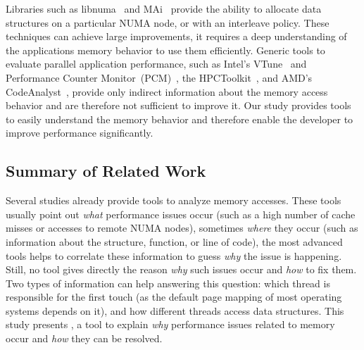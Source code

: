 Libraries such as libnuma~\cite{Kleen2004} and MAi~\cite{Ribeiro2009} provide
the ability to allocate data structures on a particular NUMA node, or with an
interleave policy. These techniques can achieve large improvements, it
requires a deep understanding of the applications memory behavior to use them
efficiently.
Generic tools to evaluate parallel application performance, such as Intel's
VTune~\cite{Reinders05VTune} and Performance Counter
Monitor~(PCM)~\cite{Intel2012b}, the HPCToolkit~\cite{Adhianto10HPCTOOLKIT},
and AMD's CodeAnalyst~\cite{Drongowski2008}, provide only indirect information
about the memory access behavior and are therefore not sufficient to improve it.
Our study provides tools to easily understand the memory behavior
and therefore enable the developer to improve performance significantly.

%

\subsection{Summary of Related Work}

Several studies already provide tools to analyze memory accesses.
These tools usually point out \emph{what} performance issues occur (such as a
high number of cache misses or accesses to remote NUMA nodes), sometimes
\emph{where} they occur (such as information about the structure, function, or
line of code), the most advanced tools helps to correlate these information to
guess \emph{why} the issue is happening. Still, no tool gives directly the
reason \emph{why} such issues occur and \emph{how} to fix them.
Two types of information can help answering this question: which thread is responsible for the first touch (as the default page mapping of most operating systems depends on it), and how different threads access data structures.
This study presents \TABARNAC, a tool to explain \emph{why} performance issues
related to memory occur and \emph{how} they can be resolved.


